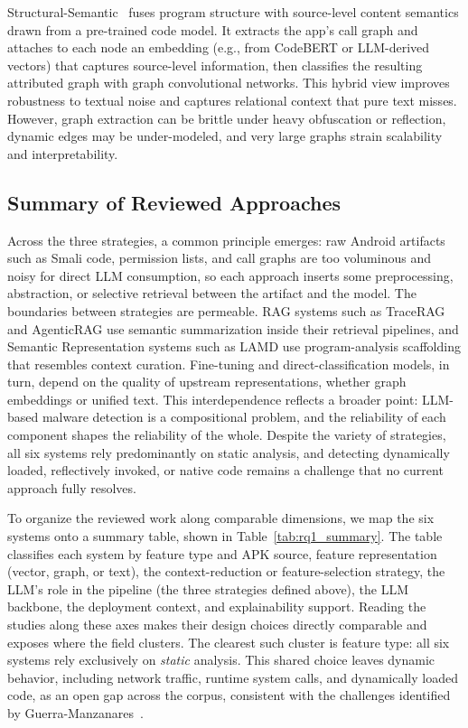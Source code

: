 Structural-Semantic~\cite{Khan2024-hy} fuses program structure with source-level content semantics drawn from a pre-trained code model. It extracts the app's call graph and attaches to each node an embedding (e.g., from CodeBERT or LLM-derived vectors) that captures source-level information, then classifies the resulting attributed graph with graph convolutional networks. This hybrid view improves robustness to textual noise and captures relational context that pure text misses. However, graph extraction can be brittle under heavy obfuscation or reflection, dynamic edges may be under-modeled, and very large graphs strain scalability and interpretability.

\subsection{Summary of Reviewed Approaches}

Across the three strategies, a common principle emerges: raw Android artifacts such as Smali code, permission lists, and call graphs are too voluminous and noisy for direct LLM consumption, so each approach inserts some preprocessing, abstraction, or selective retrieval between the artifact and the model. The boundaries between strategies are permeable. RAG systems such as TraceRAG and AgenticRAG use semantic summarization inside their retrieval pipelines, and Semantic Representation systems such as LAMD use program-analysis scaffolding that resembles context curation. Fine-tuning and direct-classification models, in turn, depend on the quality of upstream representations, whether graph embeddings or unified text. This interdependence reflects a broader point: LLM-based malware detection is a compositional problem, and the reliability of each component shapes the reliability of the whole. Despite the variety of strategies, all six systems rely predominantly on static analysis, and detecting dynamically loaded, reflectively invoked, or native code remains a challenge that no current approach fully resolves.

To organize the reviewed work along comparable dimensions, we map the six systems onto a summary table, shown in Table~\ref{tab:rq1_summary}. The table classifies each system by feature type and APK source, feature representation (vector, graph, or text), the context-reduction or feature-selection strategy, the LLM's role in the pipeline (the three strategies defined above), the LLM backbone, the deployment context, and explainability support. Reading the studies along these axes makes their design choices directly comparable and exposes where the field clusters. The clearest such cluster is feature type: all six systems rely exclusively on \textit{static} analysis. This shared choice leaves dynamic behavior, including network traffic, runtime system calls, and dynamically loaded code, as an open gap across the corpus, consistent with the challenges identified by Guerra-Manzanares~\cite{GuerraManzanares2024}.

